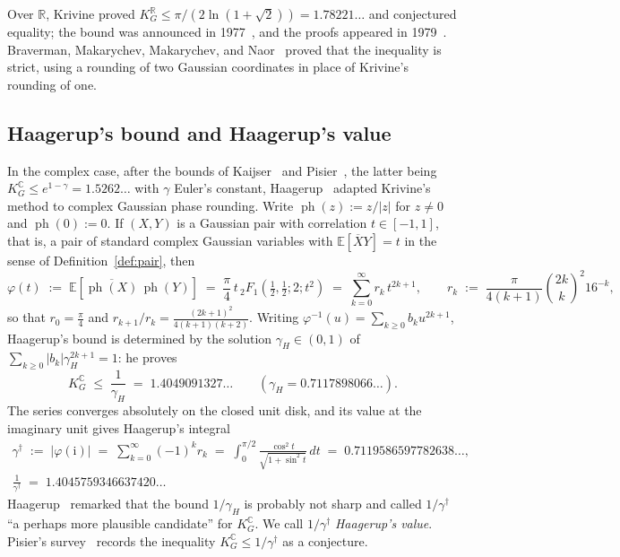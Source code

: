 \documentclass[11pt,reqno]{amsart}
\theoremstyle{definition}
\numberwithin{equation}{section}
\newcommand{\C}{\mathbb{C}}
\newcommand{\R}{\mathbb{R}}
\newcommand{\E}{\mathbb{E}}
\newcommand{\KGC}{K_G^{\C}}
\newcommand{\KGR}{K_G^{\R}}
\newcommand{\gd}{\gamma^\dagger}
\newcommand{\ph}{\operatorname{ph}}
\newcommand{\ii}{\mathrm{i}}
\begin{document}
Over $\R$, Krivine proved $\KGR \le \pi / (2\ln(1 + \sqrt{2})) = 1.78221\ldots$ and conjectured equality; the bound was announced in 1977~\cite{Kri77}, and the proofs appeared in 1979~\cite{Kri79}. Braverman, Makarychev, Makarychev, and Naor~\cite{BMMN11} proved that the inequality is strict, using a rounding of two Gaussian coordinates in place of Krivine's rounding of one.

\subsection{Haagerup's bound and Haagerup's value}
In the complex case, after the bounds of Kaijser~\cite{Kai73} and Pisier~\cite{Pis78}, the latter being $\KGC \le e^{1-\gamma} = 1.5262\ldots$ with $\gamma$ Euler's constant, Haagerup~\cite{Haa87} adapted Krivine's method to complex Gaussian phase rounding. Write $\ph(z) := z/|z|$ for $z \ne 0$ and $\ph(0) := 0$. If $(X, Y)$ is a Gaussian pair with correlation $t \in [-1,1]$, that is, a pair of standard complex Gaussian variables with $\E[\overline{X} Y] = t$ in the sense of Definition~\ref{def:pair}, then
\begin{equation}\label{eq:phi-haagerup}
  \varphi(t) \;:=\; \E\!\left[\overline{\ph(X)}\,\ph(Y)\right]
  \;=\; \frac{\pi}{4}\, t \, {}_2F_1\!\left(\tfrac{1}{2}, \tfrac{1}{2}; 2; t^2\right)
  \;=\; \sum_{k=0}^\infty r_k \, t^{2k+1},
  \qquad
  r_k \;:=\; \frac{\pi}{4(k+1)}\binom{2k}{k}^{\!2} 16^{-k} ,
\end{equation}
so that $r_0 = \frac{\pi}{4}$ and $r_{k+1}/r_k = \frac{(2k+1)^2}{4(k+1)(k+2)}$. Writing $\varphi^{-1}(u) = \sum_{k\ge0} b_k u^{2k+1}$, Haagerup's bound is determined by the solution $\gamma_H\in(0,1)$ of $\sum_{k\ge0} |b_k| \gamma_H^{2k+1}=1$: he proves
\[
  \KGC \;\le\; \frac{1}{\gamma_H} \;=\; 1.4049091327\ldots \qquad (\gamma_H = 0.7117898066\ldots).
\]
The series converges absolutely on the closed unit disk, and its value at the imaginary unit gives Haagerup's integral
\begin{equation}\label{eq:gd-def}
  \begin{gathered}
  \gd \;:=\; |\varphi(\ii)| \;=\; \sum_{k=0}^\infty (-1)^k r_k
  \;=\; \int_0^{\pi/2} \frac{\cos^2 t}{\sqrt{1 + \sin^2 t}}\,dt
  \;=\; 0.7119586597782638\ldots,\\
  \frac{1}{\gd} \;=\; 1.4045759346637420\ldots
  \end{gathered}
\end{equation}
Haagerup~\cite[p.~202]{Haa87} remarked that the bound $1/\gamma_H$ is probably not sharp and called $1/\gd$ ``a perhaps more plausible candidate'' for $\KGC$. We call $1/\gd$ \emph{Haagerup's value}. Pisier's survey~\cite[Section~4]{Pis12} records the inequality $\KGC\le1/\gd$ as a conjecture.
\end{document}
